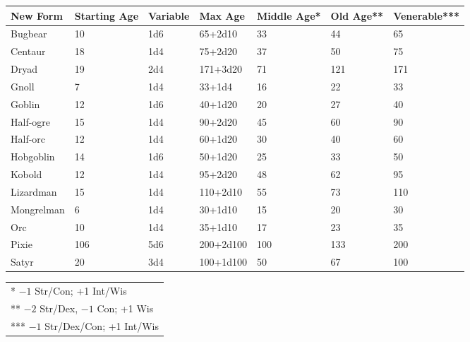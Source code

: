 \noindent
\begin{minipage}{\textwidth}

\noindent
{}
\begin{tabular}{|p{}|p{}|p{}|p{}|p{}|p{}|p{}|}
\hline
New Form	& Starting Age	& Variable	& Max Age	& Middle Age*	& Old Age**	& Venerable*** \\
\hline\hline
\rowcolor[gray]{0.9}Bugbear	& 10	& 1d6	& 65+2d10	& 33	& 44	& 65 \\
Centaur	& 18	& 1d4	& 75+2d20	& 37	& 50	& 75 \\
\rowcolor[gray]{0.9}Dryad	& 19	& 2d4	& 171+3d20	& 71	& 121	& 171 \\
Gnoll	& 7	& 1d4	& 33+1d4	& 16	& 22	& 33 \\
\rowcolor[gray]{0.9}Goblin	& 12	& 1d6	& 40+1d20	& 20	& 27	& 40 \\
Half-ogre	& 15	& 1d4	& 90+2d20	& 45	& 60	& 90 \\
\rowcolor[gray]{0.9}Half-orc	& 12	& 1d4	& 60+1d20	& 30	& 40	& 60 \\
Hobgoblin	& 14	& 1d6	& 50+1d20	& 25	& 33	& 50 \\
\rowcolor[gray]{0.9}Kobold	& 12	& 1d4	& 95+2d20	& 48	& 62	& 95 \\
Lizardman	& 15	& 1d4	& 110+2d10	& 55	& 73	& 110 \\
\rowcolor[gray]{0.9}Mongrelman	& 6	& 1d4	& 30+1d10	& 15	& 20	& 30 \\
Orc	& 10	& 1d4	& 35+1d10	& 17	& 23	& 35 \\
\rowcolor[gray]{0.9}Pixie	& 106	& 5d6	& 200+2d100	& 100	& 133	& 200 \\
Satyr	& 20	& 3d4	& 100+1d100	& 50	& 67	& 100 \\
\hline
\end{tabular}
\noindent\begin{tabular}{p{}}
* $-1$ Str/Con; +1 Int/Wis \\
** $-2$ Str/Dex, $-1$ Con; +1 Wis \\
*** $-1$ Str/Dex/Con; +1 Int/Wis \\
\end{tabular}\vspace{.5em}

\end{minipage}

